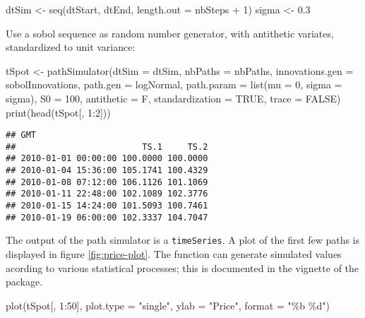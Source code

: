 \documentclass[justified]{tufte-book}
\newenvironment{Shaded}{}{}
\newcommand{\AttributeTok}[1]{\textcolor[rgb]{0.49,0.56,0.16}{#1}}
\newcommand{\ConstantTok}[1]{\textcolor[rgb]{0.53,0.00,0.00}{#1}}
\newcommand{\DecValTok}[1]{\textcolor[rgb]{0.25,0.63,0.44}{#1}}
\newcommand{\FloatTok}[1]{\textcolor[rgb]{0.25,0.63,0.44}{#1}}
\newcommand{\FunctionTok}[1]{\textcolor[rgb]{0.02,0.16,0.49}{#1}}
\newcommand{\NormalTok}[1]{#1}
\newcommand{\OtherTok}[1]{\textcolor[rgb]{0.00,0.44,0.13}{#1}}
\newcommand{\SpecialCharTok}[1]{\textcolor[rgb]{0.25,0.44,0.63}{#1}}
\newcommand{\StringTok}[1]{\textcolor[rgb]{0.25,0.44,0.63}{#1}}
\newcommand{\class}[1]{\texttt{#1}}
\begin{document}
\begin{Shaded}
\begin{Highlighting}[]
\NormalTok{dtSim }\OtherTok{\textless{}{-}} \FunctionTok{seq}\NormalTok{(dtStart, dtEnd, }\AttributeTok{length.out =}\NormalTok{ nbSteps }\SpecialCharTok{+}
    \DecValTok{1}\NormalTok{)}
\NormalTok{sigma }\OtherTok{\textless{}{-}} \FloatTok{0.3}
\end{Highlighting}
\end{Shaded}

Use a sobol sequence as random number generator, with antithetic variates, standardized to unit variance:

\begin{Shaded}
\begin{Highlighting}[]
\NormalTok{tSpot }\OtherTok{\textless{}{-}} \FunctionTok{pathSimulator}\NormalTok{(}\AttributeTok{dtSim =}\NormalTok{ dtSim, }\AttributeTok{nbPaths =}\NormalTok{ nbPaths,}
    \AttributeTok{innovations.gen =}\NormalTok{ sobolInnovations, }\AttributeTok{path.gen =}\NormalTok{ logNormal,}
    \AttributeTok{path.param =} \FunctionTok{list}\NormalTok{(}\AttributeTok{mu =} \DecValTok{0}\NormalTok{, }\AttributeTok{sigma =}\NormalTok{ sigma), }\AttributeTok{S0 =} \DecValTok{100}\NormalTok{,}
    \AttributeTok{antithetic =}\NormalTok{ F, }\AttributeTok{standardization =} \ConstantTok{TRUE}\NormalTok{, }\AttributeTok{trace =} \ConstantTok{FALSE}\NormalTok{)}
\FunctionTok{print}\NormalTok{(}\FunctionTok{head}\NormalTok{(tSpot[, }\DecValTok{1}\SpecialCharTok{:}\DecValTok{2}\NormalTok{]))}
\end{Highlighting}
\end{Shaded}

\begin{verbatim}
## GMT 
##                         TS.1     TS.2
## 2010-01-01 00:00:00 100.0000 100.0000
## 2010-01-04 15:36:00 105.1741 100.4329
## 2010-01-08 07:12:00 106.1126 101.1069
## 2010-01-11 22:48:00 102.1089 102.3776
## 2010-01-15 14:24:00 101.5093 100.7461
## 2010-01-19 06:00:00 102.3337 104.7047
\end{verbatim}

The output of the path simulator is a \class{timeSeries}. A plot of the first few paths is
displayed in figure \ref{fig:price-plot}. The function can generate simulated
values acording to various statistical processes; this is documented in
the vignette of the package.

\begin{Shaded}
\begin{Highlighting}[]
\FunctionTok{plot}\NormalTok{(tSpot[, }\DecValTok{1}\SpecialCharTok{:}\DecValTok{50}\NormalTok{], }\AttributeTok{plot.type =} \StringTok{"single"}\NormalTok{, }\AttributeTok{ylab =} \StringTok{"Price"}\NormalTok{,}
    \AttributeTok{format =} \StringTok{"\%b \%d"}\NormalTok{)}
\end{Highlighting}
\end{Shaded}
\end{document}
